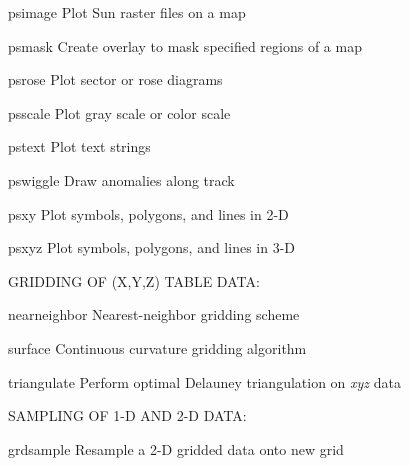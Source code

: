 \documentclass{article}
\begin{document}
\par 	psimage	Plot Sun raster files on a map\par 

\par 	psmask	Create overlay to mask specified regions of a map\par 

\par 	psrose	Plot sector or rose diagrams\par 

\par 	psscale	Plot gray scale or color scale\par 

\par 	pstext	Plot text strings\par 

\par 	pswiggle	Draw anomalies along track\par 

\par 	psxy	Plot symbols, polygons, and lines in 2-D\par 

\par 	psxyz	Plot symbols, polygons, and lines in 3-D\par 

\par \par 

\par GRIDDING OF (X,Y,Z) TABLE DATA:\par 

\par 	nearneighbor	Nearest-neighbor gridding scheme\par 

\par 	surface	Continuous curvature gridding algorithm\par 

\par 	triangulate	Perform optimal Delauney triangulation on {\it xyz} data\par 

\par \par 

\par SAMPLING OF 1-D AND 2-D DATA:\par 

\par 	grdsample	Resample a 2-D gridded data onto new grid\par 
\end{document}
